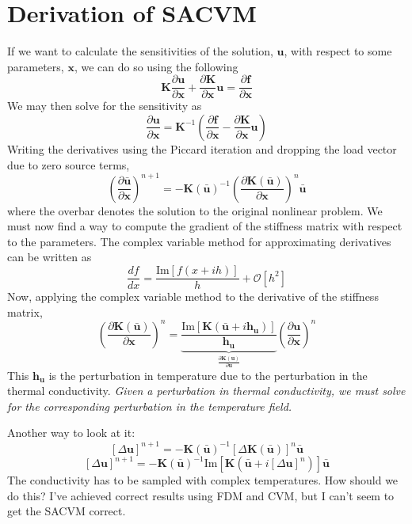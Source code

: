 \documentclass{article}
\begin{document}
\section{Derivation of SACVM}
If we want to calculate the sensitivities of the solution, $\mathbf{u}$, with respect to some parameters, $\mathbf{x}$, we can do so using the following
\begin{equation}
  \mathbf{K} \frac{\partial \mathbf{u}}{\partial \mathbf{x}} + \frac{\partial \mathbf{K}}{\partial \mathbf{x}}\mathbf{u} = \frac{\partial \mathbf{f}}{\partial \mathbf{x}}
  \label{eq:14}
\end{equation}
We may then solve for the sensitivity as 
\begin{equation}
  \frac{\partial \mathbf{u}}{\partial\mathbf{x}} = \mathbf{K}^{-1}\left(\frac{\partial \mathbf{f}}{\partial \mathbf{x}} - \frac{\partial \mathbf{K}}{\partial \mathbf{x}} \mathbf{u} \right)
\end{equation}
Writing the derivatives using the Piccard iteration and dropping the load vector due to zero source terms,
\begin{equation}
  \left(\frac{\partial\mathbf{\bar{u}}}{\partial \mathbf{x}}\right)^{n+1} = - \mathbf{K}(\mathbf{\bar{u}})^{-1} \left(\frac{\partial \mathbf{K}(\mathbf{\bar{u}})}{\partial \mathbf{x}}\right)^n \mathbf{\bar{u}}
  \label{eq:piccard}
\end{equation}
where the overbar denotes the solution to the original nonlinear problem.  We must now find a way to compute the gradient of the stiffness matrix with respect to the parameters.  The complex variable method for approximating derivatives can be written as
\[
  \frac{df}{dx} = \frac{\text{Im}[f(x + ih)]}{h} + \mathcal{O}[h^2]
\]
Now, applying the complex variable method to the derivative of the stiffness matrix,
\begin{equation}
  \left(\frac{\partial \mathbf{K}(\mathbf{\bar{u}})}{\partial \mathbf{x}}\right)^n = \underbrace{\frac{\text{Im}\left[ \mathbf{K}(\mathbf{\bar{u}} + i \mathbf{h}_\mathbf{u})\right]}{\mathbf{h}_\mathbf{u}}}_{\displaystyle\frac{\partial \mathbf{K(u)}}{\partial\mathbf{u}}} \left(\frac{\partial \mathbf{u}}{\partial \mathbf{x}}\right)^n
\end{equation}
This $\mathbf{h_u}$ is the perturbation in temperature due to the perturbation in the thermal conductivity.  \emph{Given a perturbation in thermal conductivity, we must solve for the corresponding perturbation in the temperature field.}  

Another way to look at it:
\[
  \left[\Delta \mathbf{u}\right]^{n+1} = -\mathbf{K}(\mathbf{\bar{u}})^{-1} \left[\Delta \mathbf{K}(\mathbf{\bar{u}})\right]^{n} \mathbf{\bar{u}}
\]
\[
  [\Delta \mathbf{u}]^{n+1} = - \mathbf{K}(\mathbf{\bar{u}})^{-1} \text{Im}\left[\mathbf{K}(\mathbf{\bar{u}}+i[\Delta\mathbf{u}]^n)\right] \mathbf{\bar{u}}
\]
The conductivity has to be sampled with complex temperatures.  How should we do this?  I've achieved correct results using FDM and CVM, but I can't seem to get the SACVM correct.
\end{document}

